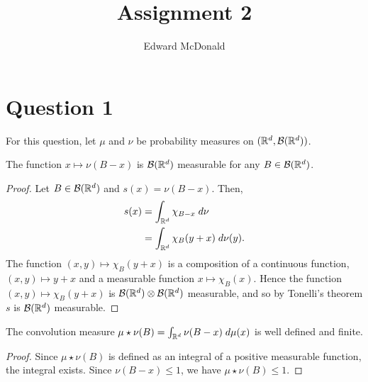 \documentclass{unswmaths}
\begin{document}
\subject{Measure Theory}
\author{Edward McDonald}
\title{Assignment 2}


\setlength\parindent{0pt}


\newcommand{\Bor}{\mathcal{B}}
\newcommand{\sdiff}{\bigtriangleup}

\unswtitle{}


\section*{Question 1}
For this question, let $\mu$ and $\nu$ be probability measures
    on $(\Rl^d,\Bor(\Rl^d))$.

\begin{lemma}
    The function $x\mapsto \nu(B-x)$ is $\Bor(\Rl^d)$
    measurable for any $B \in \Bor(\Rl^d)$.
\end{lemma} 
\begin{proof}
    Let $B \in \Bor(\Rl^d)$ and $s(x) = \nu(B-x)$. Then,
    \begin{align*}
        s(x) &= \int_{\mathbb{R}^d} \chi_{B-x}\;d\nu\\
        &= \int_{\mathbb{R}^d} \chi_B(y+x)\;d\nu(y).
    \end{align*}
    The function $(x,y)\mapsto \chi_{B}(y+x)$
    is a composition of a continuous function, $(x,y)\mapsto y+x$
    and a measurable function $x\mapsto \chi_B(x)$. 
    Hence the function $(x,y)\mapsto \chi_{B}(y+x)$
    is $\Bor(\Rl^d)\otimes\Bor(\Rl^d)$ measurable,
    and so by Tonelli's theorem $s$ is $\Bor(\Rl^d)$
    measurable.
\end{proof}

\begin{lemma}
    The convolution measure $\mu\star\nu(B) = \int_{\mathbb{R}^d} \nu(B-x)\;d\mu(x)$
    is well defined and finite.
\end{lemma}
\begin{proof}
    Since $\mu\star\nu(B)$ is defined as an integral of a positive
    measurable function, the integral exists. Since $\nu(B-x) \leq 1$,
    we have $\mu\star\nu(B) \leq 1$.
\end{proof}
\end{document}
